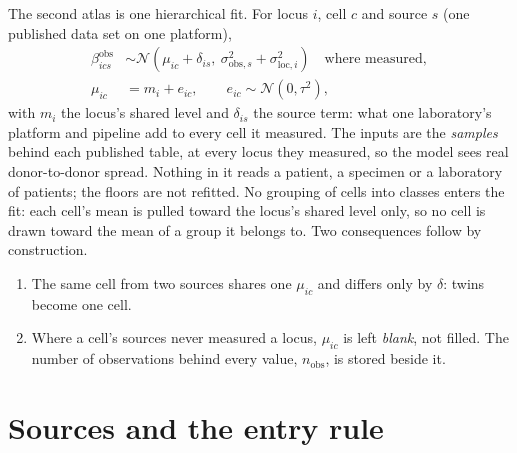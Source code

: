 The second atlas is one hierarchical fit. For locus $i$, cell $c$ and source $s$ (one published data set on one platform),
\begin{align}
  \beta^{\mathrm{obs}}_{ics}&\sim\mathcal N\!\left(\mu_{ic}+\delta_{is},\ \sigma^2_{\mathrm{obs},s}+\sigma^2_{\mathrm{loc},i}\right)\quad\text{where measured},\\
  \mu_{ic}&=m_i+e_{ic},\qquad e_{ic}\sim\mathcal N(0,\tau^2),
\end{align}
with $m_i$ the locus's shared level and $\delta_{is}$ the source term: what one laboratory's platform and pipeline add to every cell it
measured. The inputs are the \emph{samples} behind each published table, at every locus they measured, so the model sees real donor-to-donor
spread. Nothing in it reads a patient, a specimen or a laboratory of patients; the floors are not refitted. No grouping of cells into classes enters
the fit: each cell's mean is pulled toward the locus's shared level only, so no cell is drawn toward the mean of a group it
belongs to. Two consequences follow by construction.
\begin{enumerate}
\item The same cell from two sources shares one $\mu_{ic}$ and differs only by $\delta$: twins become one cell.
\item Where a cell's sources never measured a locus, $\mu_{ic}$ is left \emph{blank}, not filled. The number of observations behind every value,
      $n_{\mathrm{obs}}$, is stored beside it.
\end{enumerate}

\section{Sources and the entry rule}

